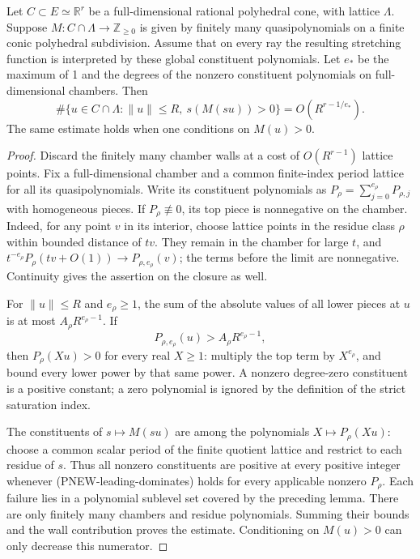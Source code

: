 \begin{lemma}
Let $C\subset E\simeq\mathbb R^r$ be a full-dimensional
rational polyhedral cone, with lattice $\Lambda$.
Suppose $M:C\cap\Lambda\to\mathbb Z_{\ge0}$ is given by
finitely many quasipolynomials on a finite conic polyhedral
subdivision.  Assume that on every ray the resulting stretching
function is interpreted by these global constituent polynomials.
Let $e_*$ be the maximum of 1 and the degrees of the nonzero
constituent polynomials on full-dimensional chambers.  Then
\[
 \#\{u\in C\cap\Lambda:\|u\|\le R,
                      \ s(M(su))>0\}
                 =O(R^{r-1/e_*}).
 \tag{PNEW-density-Euclidean}
\]
The same estimate holds when one conditions on $M(u)>0$.
\end{lemma}
\begin{proof}
Discard the finitely many chamber walls at a cost of
$O(R^{r-1})$ lattice points.  Fix a full-dimensional chamber
and a common finite-index period lattice for all its
quasipolynomials.  Write its constituent polynomials as
$P_\rho=\sum_{j=0}^{e_\rho}P_{\rho,j}$ with homogeneous
pieces.  If $P_\rho\not\equiv0$, its top piece is nonnegative
on the chamber.  Indeed, for any point $v$ in its interior,
choose lattice points in the residue class $\rho$ within
bounded distance of $tv$.  They remain in the chamber for
large $t$, and
$t^{-e_\rho}P_\rho(tv+O(1))\to P_{\rho,e_\rho}(v)$;
the terms before the limit are nonnegative.  Continuity gives
the assertion on the closure as well.

For $\|u\|\le R$ and $e_\rho\ge1$, the sum of the absolute
values of all lower pieces at $u$ is at most
$A_\rho R^{e_\rho-1}$.  If
\[
        P_{\rho,e_\rho}(u)>A_\rho R^{e_\rho-1},
 \tag{PNEW-leading-dominates}
\]
then $P_\rho(Xu)>0$ for every real $X\ge1$: multiply the
top term by $X^{e_\rho}$, and bound every lower power by
that same power.  A nonzero degree-zero constituent is a
positive constant; a zero polynomial is ignored by the
definition of the strict saturation index.

The constituents of $s\mapsto M(su)$ are among the
polynomials $X\mapsto P_\rho(Xu)$: choose a common scalar
period of the finite quotient lattice and restrict to each
residue of $s$.  Thus all nonzero constituents are positive
at every positive integer whenever
(PNEW-leading-dominates) holds for every applicable nonzero
$P_\rho$.  Each failure lies in a polynomial sublevel set
covered by the preceding lemma.  There are only finitely
many chambers and residue polynomials.  Summing their
bounds and the wall contribution proves the estimate.
Conditioning on $M(u)>0$ can only decrease this numerator.
\end{proof}

